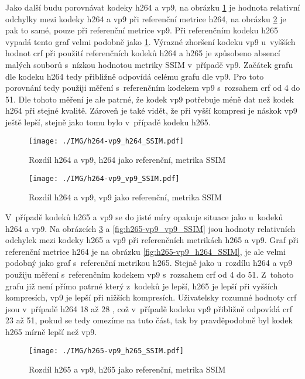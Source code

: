 \documentclass[thesis=M,czech]{FITthesis}[2016/06/26]
\begin{document}
Jako další budu porovnávat kodeky h264 a vp9, na obrázku \ref{fig:h264-vp9_h264_SSIM} je hodnota relativní odchylky mezi kodeky h264 a vp9 při referenční metrice h264, na obrázku  \ref{fig:h264-vp9_vp9_SSIM} je pak to samé, pouze při referenční metrice vp9. Při referenčním kodeku h265 vypadá tento graf velmi podobně jako \ref{fig:h264-vp9_h264_SSIM}. Výrazné zhoršení kodeku vp9 u~vyšších hodnot crf při použití referenčních kodeků h264 a h265 je způsobeno absencí malých souborů s~nízkou hodnotou metriky SSIM v~případě vp9. Začátek grafu dle kodeku h264 tedy přibližně odpovídá celému grafu dle vp9. Pro toto porovnání tedy použiji měření s~referenčním kodekem vp9 s~rozsahem crf od 4 do 51. Dle tohoto měření je ale patrné, že kodek vp9 potřebuje méně dat než kodek h264 při stejné kvalitě. Zároveň je také vidět, že při vyšší kompresi je náskok vp9 ještě lepší, stejně jako tomu bylo v~případě kodeku h265. 
\begin{figure}[]\centering
\texttt{[image: ./IMG/h264-vp9\_h264\_SSIM.pdf]}
\caption{Rozdíl h264 a vp9, h264 jako referenční, metrika SSIM}
\label{fig:h264-vp9_h264_SSIM}
\end{figure}

\begin{figure}[]\centering
\texttt{[image: ./IMG/h264-vp9\_vp9\_SSIM.pdf]}
\caption{Rozdíl h264 a vp9, vp9 jako referenční, metrika SSIM}
\label{fig:h264-vp9_vp9_SSIM}
\end{figure}

V~případě kodeků h265 a vp9 se do jisté míry opakuje situace jako u~kodeků h264 a vp9. Na obrázcích \ref{fig:h265-vp9_h265_SSIM} a \ref{fig:h265-vp9_vp9_SSIM} jsou hodnoty relativních odchylek mezi kodeky h265 a vp9 při referenčních metrikách h265 a vp9. Graf při referenční metrice h264 je na obrázku \ref{fig:h265-vp9_h264_SSIM}, je ale velmi podobný jako graf s~referenční metrikou h265. Stejně jako u~rozdílu h264 a vp9 použiju měření s~referenčním kodekem vp9 s~rozsahem crf od 4 do 51. Z~tohoto grafu již není přímo patrné který z~kodeků je lepší, h265 je lepší při vyšších kompresích, vp9 je lepší při nižších kompresích. Uživatelsky rozumné hodnoty crf jsou v~případě h264 18 až 28 \cite{crf}, což v~případě kodeku vp9 přibližně odpovídá crf 23 až 51, pokud se tedy omezíme na tuto část, tak by pravděpodobně byl kodek h265 mírně lepší než vp9.
\begin{figure}[]\centering
\texttt{[image: ./IMG/h265-vp9\_h265\_SSIM.pdf]}
\caption{Rozdíl h265 a vp9, h265 jako referenční, metrika SSIM}
\label{fig:h265-vp9_h265_SSIM}
\end{figure}
\end{document}
